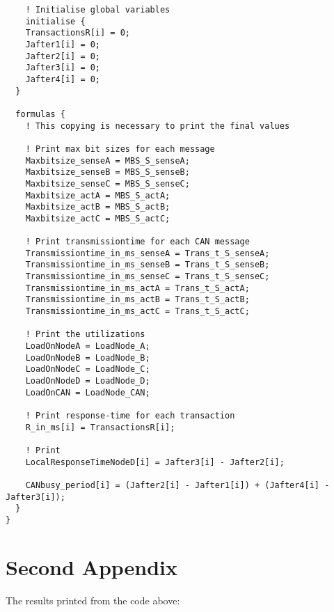 \begin{lstlisting}
  	! Initialise global variables
  	initialise {
    TransactionsR[i] = 0;
    Jafter1[i] = 0;
    Jafter2[i] = 0;
	Jafter3[i] = 0;
	Jafter4[i] = 0;
  }

  formulas {
    ! This copying is necessary to print the final values
    
	! Print max bit sizes for each message
	Maxbitsize_senseA = MBS_S_senseA;
	Maxbitsize_senseB = MBS_S_senseB;
	Maxbitsize_senseC = MBS_S_senseC;
	Maxbitsize_actA = MBS_S_actA;
	Maxbitsize_actB = MBS_S_actB;
	Maxbitsize_actC = MBS_S_actC;
	
	! Print transmissiontime for each CAN message
	Transmissiontime_in_ms_senseA = Trans_t_S_senseA;
	Transmissiontime_in_ms_senseB = Trans_t_S_senseB;
	Transmissiontime_in_ms_senseC = Trans_t_S_senseC;
	Transmissiontime_in_ms_actA = Trans_t_S_actA;
	Transmissiontime_in_ms_actB = Trans_t_S_actB;
	Transmissiontime_in_ms_actC = Trans_t_S_actC;

	! Print the utilizations
	LoadOnNodeA = LoadNode_A;
	LoadOnNodeB = LoadNode_B;
	LoadOnNodeC = LoadNode_C;
	LoadOnNodeD = LoadNode_D;
	LoadOnCAN = LoadNode_CAN;

	! Print response-time for each transaction
	R_in_ms[i] = TransactionsR[i];

	! Print 
	LocalResponseTimeNodeD[i] = Jafter3[i] - Jafter2[i];

	CANbusy_period[i] = (Jafter2[i] - Jafter1[i]) + (Jafter4[i] - Jafter3[i]);
  }
}

\end{lstlisting}

\section{Second Appendix}

The results printed from the code above:

